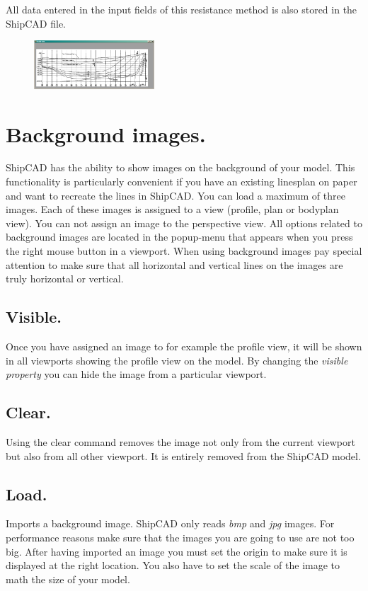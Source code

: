 \documentclass[12pt]{article}
\begin{document}
All data entered in the input fields of this resistance method is also stored in the ShipCAD file.

\pagebreak

\begin{figure}
        \centering
        \includegraphics[width=0.4\textwidth,natwidth=579,natheight=234]{backgroundimage-1.png}
        \caption{}
        \label{fig:backgroundimage1}
\end{figure}

\section{Background images.}
ShipCAD has the ability to show images on the background of your
model. This functionality is particularly convenient if you have an
existing linesplan on paper and want to recreate the lines in
ShipCAD. You can load a maximum of three images. Each of these images
is assigned to a view (profile, plan or bodyplan view). You can not
assign an image to the perspective view. All options related to
background images are located in the popup-menu that appears when you
press the right mouse button in a viewport. When using background
images pay special attention to make sure that all horizontal and
vertical lines on the images are truly horizontal or vertical.

\subsection{Visible.}
Once you have assigned an image to for example the profile view, it
will be shown in all viewports showing the profile view on the
model. By changing the \textit{visible property} you can hide the image from a
particular viewport.

\subsection{Clear.}
Using the clear command removes the image not only from the current
viewport but also from all other viewport. It is entirely removed from
the ShipCAD model.

\subsection{Load.}
Imports a background image. ShipCAD only reads \textit{bmp}
and \textit{jpg} images. For performance reasons make sure that the
images you are going to use are not too big. After having imported an
image you must set the origin to make sure it is displayed at the
right location. You also have to set the scale of the image to math
the size of your model.
\end{document}
